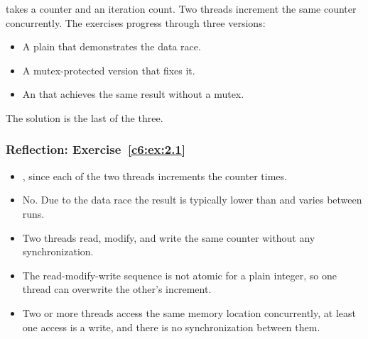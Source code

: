  takes a counter and an iteration count. Two threads increment the same
counter concurrently. The exercises progress through three versions:
\begin{itemize}
  \item A plain  that demonstrates the data race.
  \item A mutex-protected version that fixes it.
  \item An  that achieves the same result without a mutex.
\end{itemize}
The solution is the last of the three.


\subsubsection{Reflection: Exercise~\ref{c6:ex:2.1}}
\begin{itemize}
  \item {}, since each of the two threads increments the counter  times.
\end{itemize}

\begin{itemize}
  \item No. Due to the data race the result is typically lower than  and varies
    between runs.
\end{itemize}

\begin{itemize}
  \item Two threads read, modify, and write the same counter without any synchronization.
  \item The read-modify-write sequence is not atomic for a plain integer, so one thread can
    overwrite the other's increment.
\end{itemize}

\begin{itemize}
  \item Two or more threads access the same memory location concurrently, at least one access is a
    write, and there is no synchronization between them.
\end{itemize}

